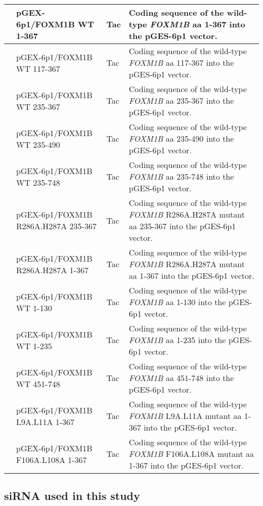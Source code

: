 {\begin{longtable}{|>{\centering\arraybackslash}m{1cm}|>{\centering\arraybackslash}m{4cm}|>{\centering\arraybackslash}m{1.5cm}|>{\raggedright\arraybackslash}m{7.2cm}|}
    3059 & pGEX-6p1/FOXM1B WT 1-367 & Tac & Coding sequence of the wild-type \textit{FOXM1B} aa 1-367 into the pGES-6p1 vector.\\
    \hline
    3060 & pGEX-6p1/FOXM1B WT 117-367 & Tac & Coding sequence of the wild-type \textit{FOXM1B} aa 117-367 into the pGES-6p1 vector.\\
    \hline
    3061 & pGEX-6p1/FOXM1B WT 235-367 & Tac & Coding sequence of the wild-type \textit{FOXM1B} aa 235-367 into the pGES-6p1 vector.\\
    \hline
    3062 & pGEX-6p1/FOXM1B WT 235-490 & Tac & Coding sequence of the wild-type \textit{FOXM1B} aa 235-490 into the pGES-6p1 vector.\\
    \hline
    3063 & pGEX-6p1/FOXM1B WT 235-748 & Tac & Coding sequence of the wild-type \textit{FOXM1B} aa 235-748 into the pGES-6p1 vector.\\
    \hline
    3064 & pGEX-6p1/FOXM1B R286A.H287A 235-367 & Tac & Coding sequence of the wild-type \textit{FOXM1B} R286A.H287A mutant aa 235-367 into the pGES-6p1 vector.\\
    \hline
    3065 & pGEX-6p1/FOXM1B R286A.H287A 1-367 & Tac & Coding sequence of the wild-type \textit{FOXM1B} R286A.H287A mutant aa 1-367 into the pGES-6p1 vector.\\
    \hline
    3066 & pGEX-6p1/FOXM1B WT 1-130 & Tac & Coding sequence of the wild-type \textit{FOXM1B} aa 1-130 into the pGES-6p1 vector.\\
    \hline
    3067 & pGEX-6p1/FOXM1B WT 1-235 & Tac & Coding sequence of the wild-type \textit{FOXM1B} aa 1-235 into the pGES-6p1 vector.\\
    \hline
    3068 & pGEX-6p1/FOXM1B WT 451-748 & Tac & Coding sequence of the wild-type \textit{FOXM1B} aa 451-748 into the pGES-6p1 vector.\\
    \hline
    3070 & pGEX-6p1/FOXM1B L9A.L11A 1-367 & Tac & Coding sequence of the wild-type \textit{FOXM1B} L9A.L11A mutant aa 1-367 into the pGES-6p1 vector.\\
    \hline
    3071 & pGEX-6p1/FOXM1B F106A.L108A 1-367 & Tac & Coding sequence of the wild-type \textit{FOXM1B} F106A.L108A mutant aa 1-367 into the pGES-6p1 vector.\\
    \hline
\end{longtable}
}

\subsection{siRNA used in this study}

